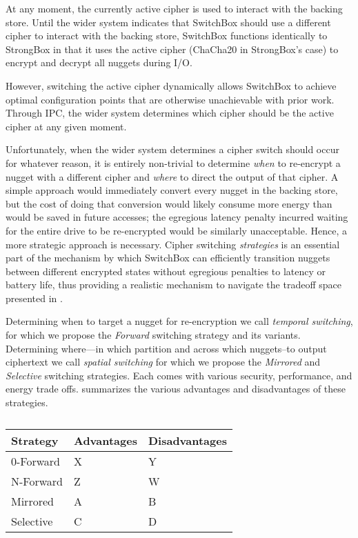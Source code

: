 At any moment, the currently active cipher is used to interact with the backing
store. Until the wider system indicates that SwitchBox should use a different
cipher to interact with the backing store, SwitchBox functions identically to
StrongBox in that it uses the active cipher (ChaCha20 in StrongBox's case) to
encrypt and decrypt all nuggets during I/O.

However, switching the active cipher dynamically allows SwitchBox to achieve
optimal configuration points that are otherwise unachievable with prior work.
Through IPC, the wider system determines which cipher should be the active
cipher at any given moment.

Unfortunately, when the wider system determines a cipher switch should occur for
whatever reason, it is entirely non-trivial to determine \emph{when} to
re-encrypt a nugget with a different cipher and \emph{where} to direct the
output of that cipher. A simple approach would immediately convert every nugget
in the backing store, but the cost of doing that conversion would likely consume
more energy than would be saved in future accesses; the egregious latency
penalty incurred waiting for the entire drive to be re-encrypted would be
similarly unacceptable. Hence, a more strategic approach is necessary. Cipher
switching \emph{strategies} is an essential part of the mechanism by which
SwitchBox can efficiently transition nuggets between different encrypted states
without egregious penalties to latency or battery life, thus providing a
realistic mechanism to navigate the tradeoff space presented in
.

Determining when to target a nugget for re-encryption we call \emph{temporal
switching}, for which we propose the \emph{Forward} switching strategy and its
variants. Determining where---in which partition and across which nuggets--to
output ciphertext we call \emph{spatial switching} for which we propose the
\emph{Mirrored} and \emph{Selective} switching strategies. Each comes with
various security, performance, and energy trade offs.
 summarizes the various advantages and
disadvantages of these strategies.

\begin{table}[]
   \begin{tabular}{@{}lll@{}}
   \toprule
   \textbf{Strategy} & \textbf{Advantages} & \textbf{Disadvantages} \\ \midrule
   0-Forward     & X     & Y \\
   N-Forward     & Z     & W \\
   Mirrored      & A     & B \\
   Selective     & C     & D \\
   \end{tabular}
   \caption{}
   \label{tbl:strategies-advantages}
\end{table}

